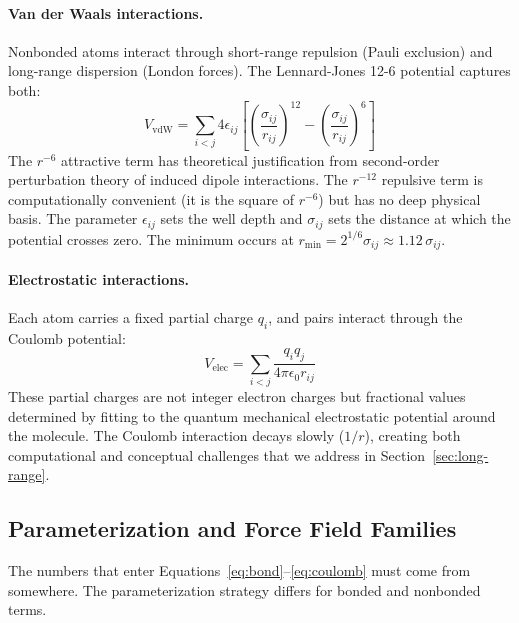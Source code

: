 \paragraph{Van der Waals interactions.} Nonbonded atoms interact through short-range repulsion (Pauli exclusion) and long-range dispersion (London forces). The Lennard-Jones 12-6 potential captures both:
\begin{equation}
\label{eq:lj}
V_{\text{vdW}} = \sum_{i<j} 4\epsilon_{ij} \left[ \left(\frac{\sigma_{ij}}{r_{ij}}\right)^{12} - \left(\frac{\sigma_{ij}}{r_{ij}}\right)^6 \right]
\end{equation}
The $r^{-6}$ attractive term has theoretical justification from second-order perturbation theory of induced dipole interactions. The $r^{-12}$ repulsive term is computationally convenient (it is the square of $r^{-6}$) but has no deep physical basis. The parameter $\epsilon_{ij}$ sets the well depth and $\sigma_{ij}$ sets the distance at which the potential crosses zero. The minimum occurs at $r_{\min} = 2^{1/6} \sigma_{ij} \approx 1.12\,\sigma_{ij}$.

\paragraph{Electrostatic interactions.} Each atom carries a fixed partial charge $q_i$, and pairs interact through the Coulomb potential:
\begin{equation}
\label{eq:coulomb}
V_{\text{elec}} = \sum_{i<j} \frac{q_i q_j}{4\pi\epsilon_0 r_{ij}}
\end{equation}
These partial charges are not integer electron charges but fractional values determined by fitting to the quantum mechanical electrostatic potential around the molecule. The Coulomb interaction decays slowly ($1/r$), creating both computational and conceptual challenges that we address in Section~\ref{sec:long-range}.

\subsection{Parameterization and Force Field Families}
\label{sec:ff-families}

The numbers that enter Equations~\ref{eq:bond}--\ref{eq:coulomb} must come from somewhere. The parameterization strategy differs for bonded and nonbonded terms.


